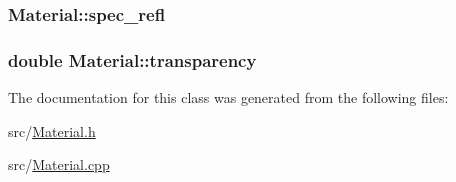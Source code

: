 \subsubsection[{\texorpdfstring{spec\+\_\+refl}{spec_refl}}]{ Material\+::spec\+\_\+refl\hspace{0.3cm}{\ttfamily [private]}}\hypertarget{classMaterial_a8b1858703e3298ba1cc705684939f953}{}\label{classMaterial_a8b1858703e3298ba1cc705684939f953}
\subsubsection[{\texorpdfstring{transparency}{transparency}}]{\setlength{\rightskip}{0pt plus 5cm}double Material\+::transparency\hspace{0.3cm}{\ttfamily [private]}}\hypertarget{classMaterial_a02abe03436775e128e04e1c737d34067}{}\label{classMaterial_a02abe03436775e128e04e1c737d34067}


The documentation for this class was generated from the following files\+:\begin{DoxyCompactItemize}
\item 
src/\hyperlink{Material_8h}{Material.\+h}\item 
src/\hyperlink{Material_8cpp}{Material.\+cpp}\end{DoxyCompactItemize}
